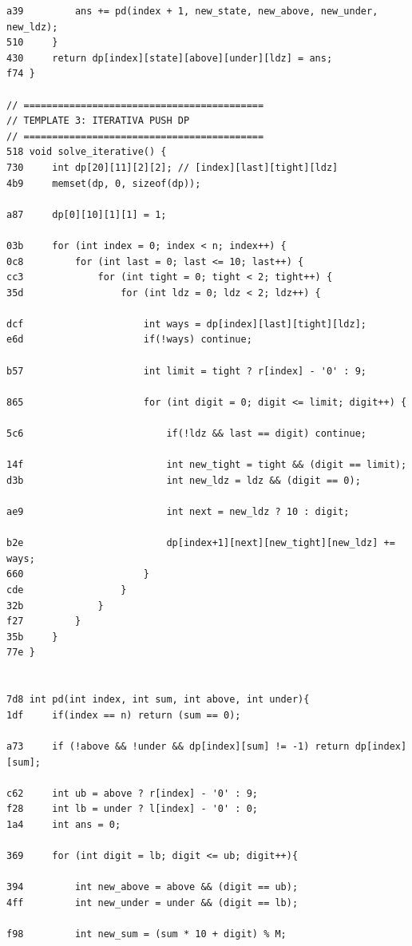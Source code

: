 \documentclass[11pt, a4paper, twoside]{article}
\begin{document}
{\begin{lstlisting}
a39         ans += pd(index + 1, new_state, new_above, new_under, new_ldz);
510     }
430     return dp[index][state][above][under][ldz] = ans; 
f74 }

// ==========================================
// TEMPLATE 3: ITERATIVA PUSH DP
// ==========================================
518 void solve_iterative() {
730     int dp[20][11][2][2]; // [index][last][tight][ldz]
4b9     memset(dp, 0, sizeof(dp));
    
a87     dp[0][10][1][1] = 1;
    
03b     for (int index = 0; index < n; index++) {
0c8         for (int last = 0; last <= 10; last++) {
cc3             for (int tight = 0; tight < 2; tight++) {
35d                 for (int ldz = 0; ldz < 2; ldz++) {
                        
dcf                     int ways = dp[index][last][tight][ldz];
e6d                     if(!ways) continue;
    
b57                     int limit = tight ? r[index] - '0' : 9;
                        
865                     for (int digit = 0; digit <= limit; digit++) {
                            
5c6                         if(!ldz && last == digit) continue;
    
14f                         int new_tight = tight && (digit == limit);
d3b                         int new_ldz = ldz && (digit == 0);
                            
ae9                         int next = new_ldz ? 10 : digit;
    
b2e                         dp[index+1][next][new_tight][new_ldz] += ways;
660                     }
cde                 }
32b             }
f27         }
35b     }
77e }


7d8 int pd(int index, int sum, int above, int under){
1df     if(index == n) return (sum == 0);
    
a73     if (!above && !under && dp[index][sum] != -1) return dp[index][sum];
    
c62     int ub = above ? r[index] - '0' : 9;
f28     int lb = under ? l[index] - '0' : 0;
1a4     int ans = 0;
    
369     for (int digit = lb; digit <= ub; digit++){
    
394         int new_above = above && (digit == ub);
4ff         int new_under = under && (digit == lb);
            
f98         int new_sum = (sum * 10 + digit) % M;
            

\end{lstlisting}}
\end{document}
